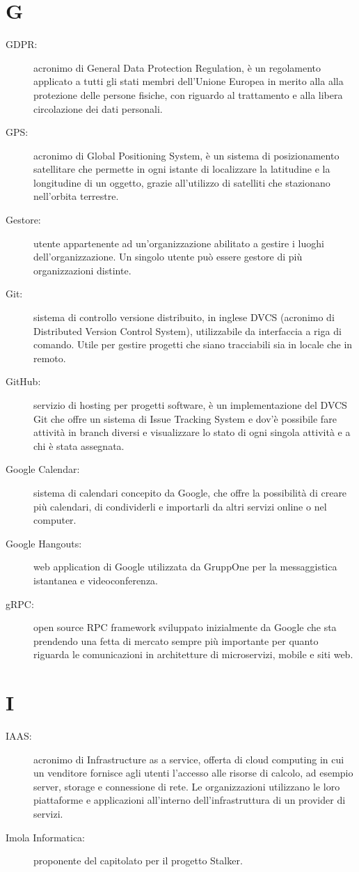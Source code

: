\documentclass{article}
\begin{document}
  \section{G}
  \begin{description}
    \item[GDPR:] acronimo di General Data Protection Regulation, è un regolamento applicato a tutti gli stati membri dell'Unione Europea in merito alla alla protezione delle persone fisiche, con riguardo al trattamento e alla libera circolazione dei dati personali.
    \item[GPS:] acronimo di Global Positioning System, è un sistema di posizionamento satellitare che permette in ogni istante di localizzare la latitudine e la longitudine di un oggetto, grazie all'utilizzo di satelliti che stazionano nell'orbita terrestre.
    \item[Gestore:] utente appartenente ad un'organizzazione abilitato a gestire i luoghi dell'organizzazione. Un singolo utente può essere gestore di più organizzazioni distinte.
    \item[Git:] sistema di controllo versione distribuito, in inglese DVCS (acronimo di Distributed Version Control System), utilizzabile da interfaccia a riga di comando. Utile per gestire progetti che siano tracciabili sia in locale che in remoto.
    \item[GitHub:] servizio di hosting per progetti software, è un implementazione del DVCS Git che offre un sistema di Issue Tracking System e dov'è possibile fare attività in branch diversi e visualizzare lo stato di ogni singola attività e a chi è stata assegnata.
    \item[Google Calendar:] sistema di calendari concepito da Google, che offre la possibilità di creare più calendari, di condividerli e importarli da altri servizi online o nel computer.
    \item[Google Hangouts:] web application di Google utilizzata da GruppOne per la messaggistica istantanea e videoconferenza.
    \item[gRPC:] open source RPC framework sviluppato inizialmente da Google che sta prendendo una fetta di mercato sempre più importante per quanto riguarda le comunicazioni in architetture di microservizi, mobile e siti web.
  \end{description}
  \newpage
  \section{I}
  \begin{description}
    \item[IAAS:] acronimo di Infrastructure as a service, offerta di cloud computing in cui un venditore fornisce agli utenti l'accesso alle risorse di calcolo, ad esempio server, storage e connessione di rete. Le organizzazioni utilizzano le loro piattaforme e applicazioni all'interno dell'infrastruttura di un provider di servizi.
    \item[Imola Informatica:] proponente del capitolato per il progetto Stalker.
  \end{description}
  \newpage
\end{document}
